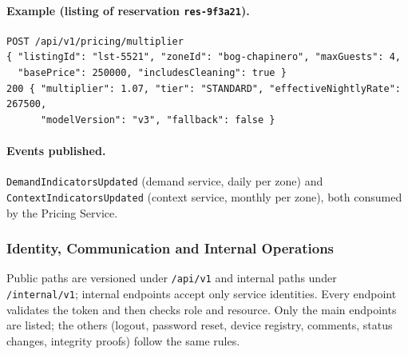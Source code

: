 \paragraph{Example (listing of reservation \texttt{res-9f3a21}).}
{\footnotesize
\begin{verbatim}
POST /api/v1/pricing/multiplier
{ "listingId": "lst-5521", "zoneId": "bog-chapinero", "maxGuests": 4,
  "basePrice": 250000, "includesCleaning": true }
200 { "multiplier": 1.07, "tier": "STANDARD", "effectiveNightlyRate": 267500,
      "modelVersion": "v3", "fallback": false }
\end{verbatim}
}

\paragraph{Events published.} \texttt{Demand\allowbreak Indicators\allowbreak Updated}
(demand service, daily per zone) and \texttt{Context\allowbreak Indicators\allowbreak Updated}
(context service, monthly per zone), both consumed by the Pricing Service.
\endgroup

\begingroup
\setlength{\emergencystretch}{3em}
\subsubsection{Identity, Communication and Internal Operations}
\label{sec:id-api}

Public paths are versioned under \texttt{/api/v1} and internal paths under
\texttt{/internal/v1}; internal endpoints accept only service identities.
Every endpoint validates the token and then checks role and resource. Only the
main endpoints are listed; the others (logout, password reset, device
registry, comments, status changes, integrity proofs) follow the same rules.

